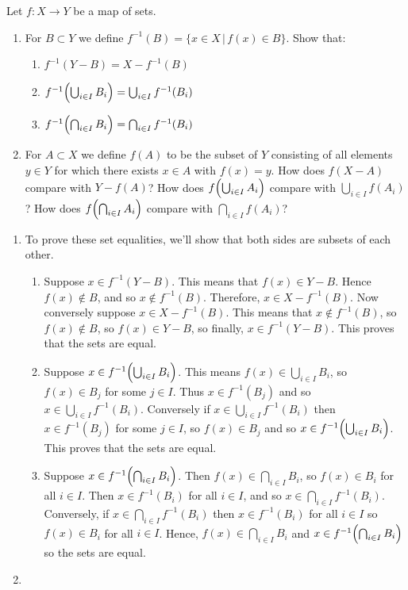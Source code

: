 \documentclass[11pt,letterpaper]{article}
\begin{document}
\pagebreak
\begin{problem}
    Let $f:X\to Y$ be a map of sets.

    \begin{enumerate}
        \item For $B\subset Y$ we define $f^{-1}(B)=\{x\in X\,|\,f(x)\in B\}$. Show that:
            \begin{enumerate}
                \item $f^{-1}(Y-B)=X-f^{-1}(B)$
                \item $f^{-1}\Bigl(\bigcup_{i\in I} B_i\Bigr)=\bigcup_{i\in I}
                f^{-1}(B_i)$
                \item $f^{-1}\Bigl(\bigcap_{i\in I} B_i\Bigr)=\bigcap_{i\in I}
                f^{-1}(B_i)$
            \end{enumerate}

        \item For $A\subset X$ we define $f(A)$ to be the subset of $Y$ consisting of
        all elements $y\in Y$ for which there exists $x\in A$ with $f(x)=y$. 
        How does $f(X-A)$ compare with $Y-f(A)$?  How does $f\Bigl(\bigcup_{i\in I}
        A_i\Bigr)$ compare with $\bigcup_{i\in I} f(A_i)$?
        How does $f\Bigl(\bigcap_{i\in I}
        A_i\Bigr)$ compare with $\bigcap_{i\in I} f(A_i)$?
    \end{enumerate}
\end{problem}

\begin{enumerate}
    \item To prove these set equalities, we'll show that both sides are subsets of each other.
        \begin{enumerate}
            \item Suppose $x \in f^{-1}(Y - B)$. This means that $f(x) \in Y - B$. Hence $f(x) \notin B$, and so $x \notin f^{-1}(B)$. Therefore, $x \in X - f^{-1}(B)$. Now conversely suppose $x \in X - f^{-1}(B)$. This means that $x \notin f^{-1}(B)$, so $f(x) \notin B$, so $f(x) \in Y - B$, so finally, $x \in f^{-1}(Y - B)$. This proves that the sets are equal.
            \item Suppose $x \in f^{-1}\Bigl(\bigcup_{i\in I} B_i\Bigr)$. This means $f(x) \in \bigcup_{i \in I} B_i$, so $f(x)\in B_j$ for some $j\in I$. Thus $x\in f^{-1}(B_j)$ and so $x\in \bigcup_{i\in I}f^{-1}(B_i)$. Conversely if $x \in \bigcup_{i \in I}f^{-1}(B_i)$ then $x \in f^{-1}(B_j)$ for some $j\in I$, so $f(x)\in B_j$ and so $x \in f^{-1}\Bigl(\bigcup_{i\in I} B_i\Bigr)$. This proves that the sets are equal.
            \item Suppose $x \in f^{-1}\Bigl(\bigcap_{i\in I} B_i\Bigr)$. Then $f(x) \in \bigcap_{i\in I} B_i$, so $f(x)\in B_i$ for all $i\in I$. Then $x\in f^{-1}(B_i)$ for all $i\in I$, and so $x\in \bigcap_{i\in I} f^{-1}(B_i)$. Conversely, if $x\in \bigcap_{i\in I} f^{-1}(B_i)$ then $x\in f^{-1}(B_i)$ for all $i\in I$ so $f(x)\in B_i$ for all $i\in I$. Hence, $f(x) \in \bigcap_{i\in I} B_i$ and $x \in f^{-1}\Bigl(\bigcap_{i\in I} B_i\Bigr)$ so the sets are equal.
        \end{enumerate}
    \item 
\end{enumerate}
\end{document}
